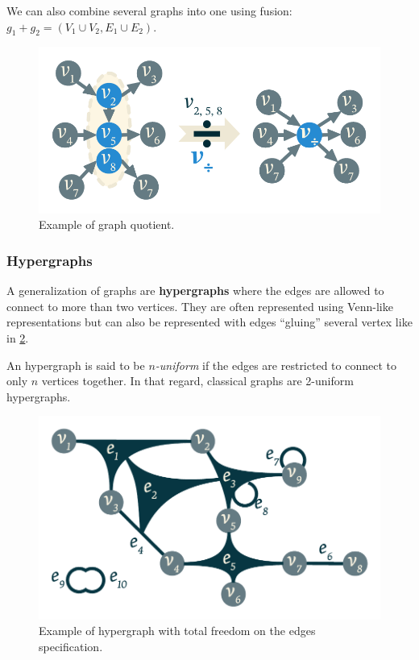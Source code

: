 \documentclass[11pt,a4paper,twoside,openright,titlepage,numbers=noenddot,headinclude,cleardoublepage=empty,openany]{scrreprt}
\theoremstyle{plain}
\theoremstyle{definition}
\theoremstyle{remark}
\begin{document}
We can also combine several graphs into one using fusion:
\(g_1 + g_2 = (V_1 \cup V_2, E_1 \cup E_2)\).

\begin{figure}
\hypertarget{fig:quotient}{%
\centering
\includegraphics{./tex2pdf.-0b80fea6fd6da7f9/2475464490ca8566bb7bf1baebb8b39f22f76132.pdf}
\caption{Example of graph quotient.}\label{fig:quotient}
}
\end{figure}

\hypertarget{hypergraphs}{%
\subsubsection{Hypergraphs}\label{hypergraphs}}

A generalization of graphs are \textbf{hypergraphs} where the edges are
allowed to connect to more than two vertices. They are often represented
using Venn-like representations but can also be represented with edges
``gluing'' several vertex like in \cref{fig:hypergraph}.

An hypergraph is said to be \emph{\(n\)-uniform} if the edges are
restricted to connect to only \(n\) vertices together. In that regard,
classical graphs are 2-uniform hypergraphs.

\begin{figure}
\hypertarget{fig:hypergraph}{%
\centering
\includegraphics{./tex2pdf.-0b80fea6fd6da7f9/e1fd48da692a432e73a1377a8a549a88a96b6162.pdf}
\caption{Example of hypergraph with total freedom on the edges
specification.}\label{fig:hypergraph}
}
\end{figure}
\end{document}
